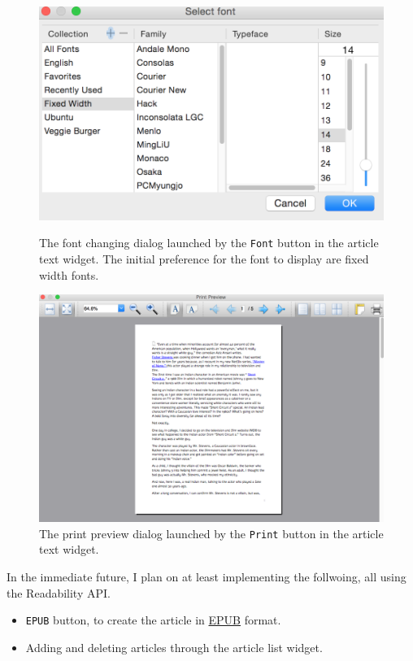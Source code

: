\documentclass[]{article}
\begin{document}
\begin{figure}[!ht]
  \parbox[!ht]{0.3\linewidth}{%
    \includegraphics[width=\linewidth]{images/gui2_screenshot_fontdialog.png}
    \caption{The font changing dialog launched by the \texttt{Font}
      button in the article text widget. The initial preference for
      the font to display are fixed width
      fonts.} \label{fig:gui2_screenshot_fontdialog} } \hfill
  \parbox[!ht]{0.6\linewidth}{%
    \includegraphics[width=\linewidth]{images/gui2_screenshot_printpreviewdialog.png}
    \caption{The print preview dialog launched by the \texttt{Print}
      button in the article text
      widget.} \label{fig:gui2_screenshot_printpreviewdialog} }
\end{figure}
In the immediate future, I plan on at least implementing the
follwoing, all using the Readability API.
\begin{itemize}
\item {\verb|EPUB|} button, to create the article in
  \href{https://en.wikipedia.org/wiki/EPUB}{EPUB} format.
  
\item Adding and deleting articles through the article list widget.
\end{itemize}
\end{document}
